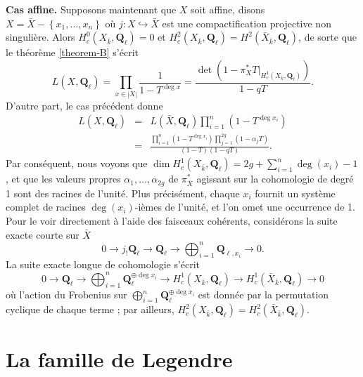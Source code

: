 \medskip\noindent
{\bf Cas affine.}
Supposons maintenant que $X$ soit affine, disons $X= \bar X-\left\{x_1, \ldots, x_n\right\}$
où $j : X \hookrightarrow \bar X$ est une compactification projective non singulière.
Alors $H_c^0(X_{\bar k}, \mathbf{Q}_\ell) = 0$ et $H_c^2(X_{\bar k},
\mathbf{Q}_\ell) = H^2(\bar X_{\bar k}, \mathbf{Q}_\ell)$, de sorte que
le théorème \ref{theorem-B}
s'écrit
$$
L(X, \mathbf{Q}_\ell) = \prod_{x \in |X|}\frac{1}{1 - T^{\deg x}} =
\frac{\det(1-\pi_X^*T |_{H_c^1(X_{\bar k}, \mathbf{Q}_\ell)})}{1 - qT}.
$$
D'autre part, le cas précédent donne
\begin{eqnarray*}
L(X, \mathbf{Q}_\ell) & = & L(\bar X,
\mathbf{Q}_\ell)\prod_{i = 1}^n\left(1-T^{\deg x_i}\right) \\
& = & \frac{\prod_{i = 1}^n(1-T^{\deg
x_i})\prod_{j = 1}^{2g}(1-\alpha_jT)}{(1-T)(1-qT)}.
\end{eqnarray*}
Par conséquent, nous voyons que $\dim H_c^1(X_{\bar k}, \mathbf{Q}_\ell) =
2g+\sum_{i = 1}^n \deg(x_i)-1$, et que les valeurs propres $\alpha_1, \ldots,
\alpha_{2g}$ de $\pi_{\bar X}^*$ agissant sur la cohomologie de degré 1 sont des racines de
l'unité. Plus précisément, chaque $x_i$ fournit un système complet de racines $\deg(x_i)$-ièmes
de l'unité, et l'on omet une occurrence de 1. Pour le voir directement à l'aide des
faisceaux cohérents, considérons la suite exacte courte sur $\bar X$
$$
0\to j_!\mathbf{Q}_\ell\to \mathbf{Q}_\ell\to\bigoplus_{i = 1}^n
\mathbf{Q}_{\ell, x_i}\to 0.
$$
La suite exacte longue de cohomologie s'écrit
$$
0\to \mathbf{Q}_\ell \to \bigoplus_{i = 1}^n \mathbf{Q}_\ell^{\oplus \deg x_i}
\to H_c^1(X_{\bar k}, \mathbf{Q}_\ell) \to H_c^1(\bar X_{\bar k},
\mathbf{Q}_\ell)\to 0
$$
où l'action du Frobenius sur $\bigoplus_{i = 1}^n \mathbf{Q}_\ell^{\oplus
\deg x_i}$ est donnée par la permutation cyclique de chaque terme ; par ailleurs, $H_c^2(X_{\bar k},
\mathbf{Q}_\ell) = H_c^2(\bar X_{\bar k}, \mathbf{Q}_\ell)$.






\section{La famille de Legendre}
\label{section-legendre-family}

